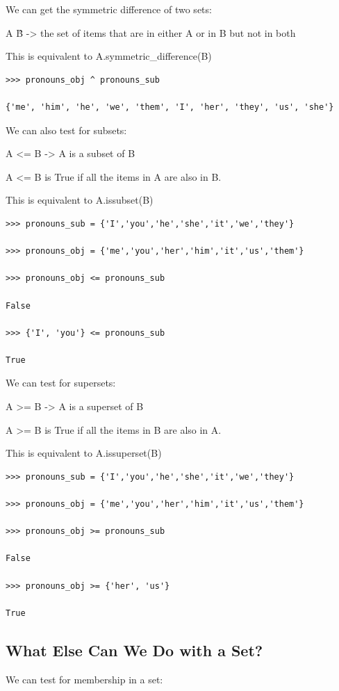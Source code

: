 \documentclass{article}
\begin{document}
We can get the symmetric difference of two sets:

A \^ B -> the set of items that are in either A or in B but not in both

This is equivalent to A.symmetric{\_}difference(B)

\begin{lstlisting}
>>> pronouns_obj ^ pronouns_sub

{'me', 'him', 'he', 'we', 'them', 'I', 'her', 'they', 'us', 'she'}
\end{lstlisting}

We can also test for subsets:

A <= B   ->  A is a subset of B

A <= B is True if all the items in A are also in B.

This is equivalent to A.issubset(B)

\begin{lstlisting}
>>> pronouns_sub = {'I','you','he','she','it','we','they'}

>>> pronouns_obj = {'me','you','her','him','it','us','them'}

>>> pronouns_obj <= pronouns_sub

False

>>> {'I', 'you'} <= pronouns_sub

True
\end{lstlisting}

We can test for supersets:

A >= B  ->  A is a superset of B

A >= B is True if all the items in B are also in A. 

This is equivalent to A.issuperset(B)

\begin{lstlisting}
>>> pronouns_sub = {'I','you','he','she','it','we','they'}

>>> pronouns_obj = {'me','you','her','him','it','us','them'}

>>> pronouns_obj >= pronouns_sub

False

>>> pronouns_obj >= {'her', 'us'}

True
\end{lstlisting}

\subsection{What Else Can We Do with a Set?}
We can test for membership in a set:
\end{document}
